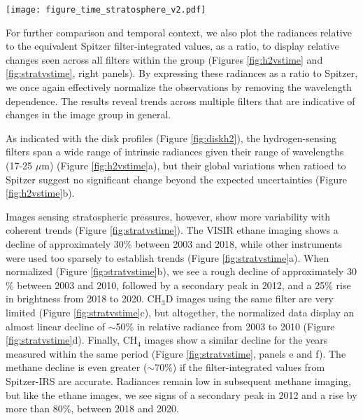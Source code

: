 \documentclass[twocolumn,10pt]{aastex631}
\begin{document}
\begin{figure*}
    \centering
    \texttt{[image: figure\_time\_stratosphere\_v2.pdf]}
    \caption{As in Figure \ref{fig:h2vstime}, disk-integrated radiances versus time for images sensing  stratospheric C$_2$H$_6$ (panels a and b), CH$_3$D (panels c and d), and CH$_4$ (panels e and f).  Dotted lines in the panels on the left show the disk-integrated radiances predicted from our atmospheric temperature/chemical model for each filter, as indicated by the corresponding open symbols to the right of the panels.  Panels on the right show radiances ratioed to Spitzer as described in the text. Deuterated methane (8--9 $\mu$m) images (panel d) show nearly linear relative drop between 2003 and 2009.  Methane (7--8 $\mu$m) images (panel f) show a similar trend prior to 2010, but with a possible systematic offset compared to our filter-integrated values for Spitzer.}
    \label{fig:stratvstime}
\end{figure*}

For further comparison and temporal context, we also plot the radiances relative to the equivalent Spitzer filter-integrated values, as a ratio, to display relative changes seen across all filters within the group (Figures \ref{fig:h2vstime} and \ref{fig:stratvstime}, right panels).  By expressing these radiances as a ratio to Spitzer, we once again effectively normalize the observations by removing the wavelength dependence.  The results reveal trends across multiple filters that are indicative of changes in the image group in general.  

As indicated with the disk profiles (Figure \ref{fig:diskh2}), the hydrogen-sensing filters span a wide range of intrinsic radiances given their range of wavelengths (17-25 $\mu$m) (Figure \ref{fig:h2vstime}a), but their global variations when ratioed to Spitzer suggest no significant change beyond the expected uncertainties (Figure \ref{fig:h2vstime}b).  

Images sensing stratospheric pressures, however, show more variability with coherent trends (Figure \ref{fig:stratvstime}).
The VISIR ethane imaging shows a decline of approximately 30$\%$ between 2003 and 2018, while other instruments were used too sparsely to establish trends (Figure \ref{fig:stratvstime}a). When normalized (Figure \ref{fig:stratvstime}b), we see a rough decline of approximately 30$\%$ between 2003 and 2010, followed by a secondary peak in 2012, and a 25$\%$ rise in brightness from 2018 to 2020. CH$_3$D images using the same filter are very limited (Figure \ref{fig:stratvstime}c), but altogether, the normalized data display an almost linear decline of $\sim$50$\%$ in relative radiance from 2003 to 2010 (Figure \ref{fig:stratvstime}d). Finally, CH$_4$ images show a similar decline for the years measured within the same period (Figure \ref{fig:stratvstime}, panels e and f).  The methane decline is even greater ($\sim$70$\%$) if the filter-integrated values from Spitzer-IRS are accurate.  Radiances remain low in subsequent methane imaging, but like the ethane images, we see signs of a secondary peak in 2012 and a rise by more than 80$\%$, between 2018 and 2020.   
\end{document}
